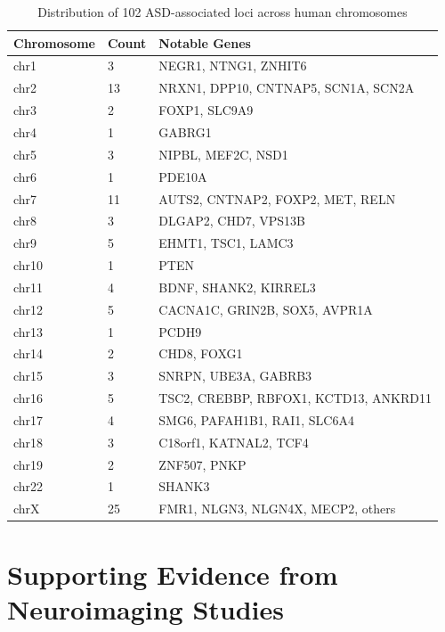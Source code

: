 \documentclass[12pt]{article}
\begin{document}
\begin{table}[h]
\centering
\caption{Distribution of 102 ASD-associated loci across human chromosomes}
\begin{tabular}{lll}
\toprule
\textbf{Chromosome} & \textbf{Count} & \textbf{Notable Genes} \\
\midrule
chr1 & 3 & NEGR1, NTNG1, ZNHIT6 \\
chr2 & 13 & NRXN1, DPP10, CNTNAP5, SCN1A, SCN2A \\
chr3 & 2 & FOXP1, SLC9A9 \\
chr4 & 1 & GABRG1 \\
chr5 & 3 & NIPBL, MEF2C, NSD1 \\
chr6 & 1 & PDE10A \\
chr7 & 11 & AUTS2, CNTNAP2, FOXP2, MET, RELN \\
chr8 & 3 & DLGAP2, CHD7, VPS13B \\
chr9 & 5 & EHMT1, TSC1, LAMC3 \\
chr10 & 1 & PTEN \\
chr11 & 4 & BDNF, SHANK2, KIRREL3 \\
chr12 & 5 & CACNA1C, GRIN2B, SOX5, AVPR1A \\
chr13 & 1 & PCDH9 \\
chr14 & 2 & CHD8, FOXG1 \\
chr15 & 3 & SNRPN, UBE3A, GABRB3 \\
chr16 & 5 & TSC2, CREBBP, RBFOX1, KCTD13, ANKRD11 \\
chr17 & 4 & SMG6, PAFAH1B1, RAI1, SLC6A4 \\
chr18 & 3 & C18orf1, KATNAL2, TCF4 \\
chr19 & 2 & ZNF507, PNKP \\
chr22 & 1 & SHANK3 \\
chrX & 25 & FMR1, NLGN3, NLGN4X, MECP2, others \\
\bottomrule
\end{tabular}
\end{table}

\section{Supporting Evidence from Neuroimaging Studies}
\end{document}
